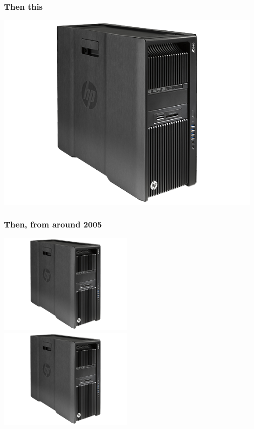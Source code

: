 \documentclass[rgb,dvipsnames]{beamer}
\begin{document}
\begin{frame}
  \frametitle{Then this}
  \begin{center}
    \includegraphics[width=\textwidth]{img/hp.jpg}
  \end{center}
\end{frame}

\begin{frame}
  \frametitle{Then, from around 2005}
  \begin{center}
    \includegraphics[width=0.5\textwidth]{img/hp.jpg}
    \includegraphics[width=0.5\textwidth]{img/hp.jpg}
  \end{center}
\end{frame}
\end{document}
